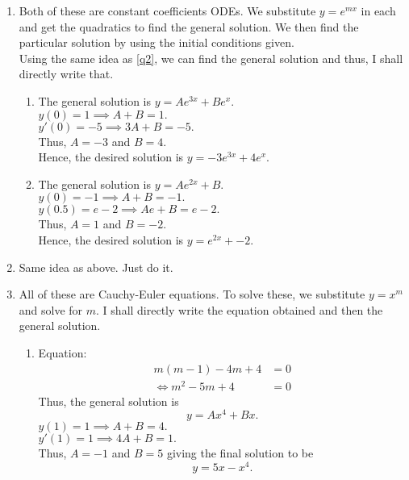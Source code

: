 \documentclass[12pt]{article}
\theoremstyle{definition}
\numberwithin{thm}{section}
\begin{document}
\begin{enumerate}[leftmargin=*, label = Q.\arabic*.]
\begin{enumerate}[label = (\roman*)]
	\end{enumerate}
	\item Both of these are constant coefficients ODEs. We substitute $y = e^{mx}$ in each and get the quadratics to find the general solution. We then find the particular solution by using the initial conditions given.\\
	Using the same idea as \ref{q2}, we can find the general solution and thus, I shall directly write that.
	\begin{enumerate}[label = (\roman*)] 
		\item The general solution is $y = Ae^{3x} + Be^x.$\\
		$y(0) = 1 \implies A + B = 1.$\\
		$y'(0) = -5 \implies 3A + B = -5.$\\
		Thus, $A = -3$ and $B = 4.$\\
		Hence, the desired solution is $y = -3e^{3x} + 4e^x.$
		\item The general solution is $y = Ae^{2x} + B.$\\
		$y(0) = -1 \implies A + B = -1.$\\
		$y(0.5) = e - 2 \implies Ae + B = e-2.$\\
		Thus, $A = 1$ and $B = -2.$\\
		Hence, the desired solution is $y = e^{2x} + -2.$
	\end{enumerate}
	\item Same idea as above. Just do it. \checkmark
	\item \label{q8} All of these are Cauchy-Euler equations. To solve these, we substitute $y = x^m$ and solve for $m.$ I shall directly write the equation obtained and then the general solution.
	\begin{enumerate}[label = (\roman*)] 
		\item Equation:
		\begin{align*} 
			m(m - 1) - 4m + 4 &= 0\\
			\iff m^2 - 5m + 4 &= 0
		\end{align*}
		Thus, the general solution is
		\begin{equation*} 
			y = Ax^4 + Bx.
		\end{equation*}
		$y(1) = 1 \implies A + B = 4.$\\
		$y'(1) = 1 \implies 4A + B = 1.$\\
		Thus, $A = -1$ and $B = 5$ giving the final solution to be
		\begin{equation*} 
			y = 5x -x^4.
		\end{equation*}

\end{enumerate}
\end{enumerate}
\end{document}
